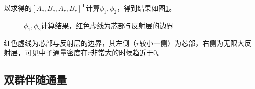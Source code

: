 以求得的$\left[A_c,B_c,A_r,B_r\right]^{\mathrm{T}}$计算$\phi_1,\phi_2$，得到结果如图\ref{fig:flux_r}。

\begin{figure}[H]
    \centering
    
    \caption{$\phi_1,\phi_2$计算结果，红色虚线为芯部与反射层的边界}
    \label{fig:flux_r}
\end{figure}

红色虚线为芯部与反射层的边界，其左侧（$r$较小一侧）为芯部，右侧为无限大反射层，可见中子通量密度在$r$非常大的时候趋近于$0$。

\subsection{双群伴随通量}
